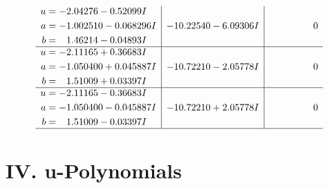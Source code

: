 \documentclass[1p]{elsarticle_modified}
\theoremstyle{definition}
\begin{document}
$$\begin{array}{c|c|c}
\begin{aligned}
u &= -2.04276 - 0.52099 I \\
a &= -1.002510 - 0.068296 I \\
b &= \phantom{-}1.46214 - 0.04893 I\end{aligned}
 & -10.22540 - 6.09306 I & \phantom{-0.000000 } 0 \\ \hline\begin{aligned}
u &= -2.11165 + 0.36683 I \\
a &= -1.050400 + 0.045887 I \\
b &= \phantom{-}1.51009 + 0.03397 I\end{aligned}
 & -10.72210 - 2.05778 I & \phantom{-0.000000 } 0 \\ \hline\begin{aligned}
u &= -2.11165 - 0.36683 I \\
a &= -1.050400 - 0.045887 I \\
b &= \phantom{-}1.51009 - 0.03397 I\end{aligned}
 & -10.72210 + 2.05778 I & \phantom{-0.000000 } 0\\
 \hline 
 \end{array}$$\newpage
\newpage\renewcommand{\arraystretch}{1}
\centering \section*{ IV. u-Polynomials}
\end{document}
